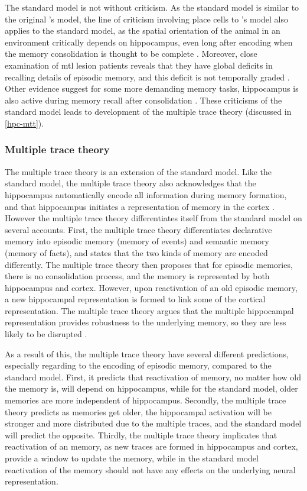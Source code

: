 The standard model is not without criticism. As the standard model is similar to the original \citet{marr71}'s model, the line of criticism involving place cells to \citet{marr71}'s model also applies to the standard model, as the spatial orientation of the animal in an environment critically depends on hippocampus, even long after encoding when the memory consolidation is thought to be complete \citet[e.g.][]{mumby99, sutherland01, clark05}. Moreover, close examination of \gls{mtl} lesion patients reveals that they have global deficits in recalling details of episodic memory, and this deficit is not temporally graded \citep{cipolotti01, viskontas02}. Other evidence suggest for some more demanding memory tasks, hippocampus is also active during memory recall after consolidation \citep{ryan01, wheeler13}. These criticisms of the standard model leads to development of the multiple trace theory (discussed in \ref{hpc-mtt}).

\subsubsection{Multiple trace theory \label{hpc-mtt}}
The multiple trace theory is an extension of the standard model. Like the standard model, the multiple trace theory also acknowledges that the hippocampus automatically encode all information during memory formation, and that hippocampus initiates a representation of memory in the cortex \citep{nadel97}. However the multiple trace theory differentiates itself from the standard model on several accounts. First, the multiple trace theory differentiates declarative memory into episodic memory (memory of events) and semantic memory (memory of facts), and states that the two kinds of memory are encoded differently. The multiple trace theory then proposes that for episodic memories, there is no consolidation process, and the memory is represented by both hippocampus and cortex. However, upon reactivation of an old episodic memory, a new hippocampal representation is formed to link some of the cortical representation. The multiple trace theory argues that the multiple hippocampal representation provides robustness to the underlying memory, so they are less likely to be disrupted \citep{nadel97}. 

As a result of this, the multiple trace theory have several different predictions, especially regarding to the encoding of episodic memory, compared to the standard model. First, it predicts that reactivation of memory, no matter how old the memory is, will depend on hippocampus, while for the standard model, older memories are more independent of hippocampus. Secondly, the multiple trace theory predicts as memories get older, the hippocampal activation will be stronger and more distributed due to the multiple traces, and the standard model will predict the opposite. Thirdly, the multiple trace theory implicates that reactivation of an memory, as new traces are formed in hippocampus and cortex, provide a window to update the memory, while in the standard model reactivation of the memory should not have any effects on the underlying neural representation. 

